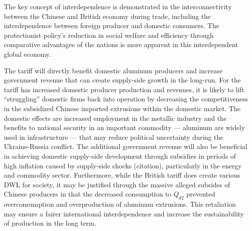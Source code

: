 \documentclass[a4paper,12pt]{article}
\begin{document}
The key concept of interdependence is demonstrated in the interconnectivity between the Chinese and British economy during trade, including the interdependence between foreign producer and domestic consumers. The protectionist policy's reduction in social welfare and efficiency through comparative advantages of the nations is more apparent in this interdependent global economy.


The tariff will directly benefit domestic aluminum producers and increase government revenue that can create supply-side growth in the long-run. For the tariff has increased domestic producer production and revenues, it is likely to lift ``struggling'' domestic firms back into operation by decreasing the competitiveness in the subsidized Chinese imported extrusions within the domestic market. The domestic effects are increased employment in the metallic industry and the benefits to national security in an important commodity --- aluminum are widely used in infrastructure --- that may reduce political uncertainty during the Ukraine-Russia conflict. The additional government revenue will also be beneficial in achieving domestic supply-side development through subsidies in periods of high inflation caused by supply-side shocks (citation), particularly in the energy and commodity sector. Furthermore, while the British tariff does create various DWL for society, it may be justified through the massive alleged subsides of Chinese producers in that the decreased consumption to $Q_{d2}$ prevented overconsumption and overproduction of aluminum extrusions. This retaliation may ensure a fairer international interdependence and increase the sustainability of production in the long term.
\end{document}
